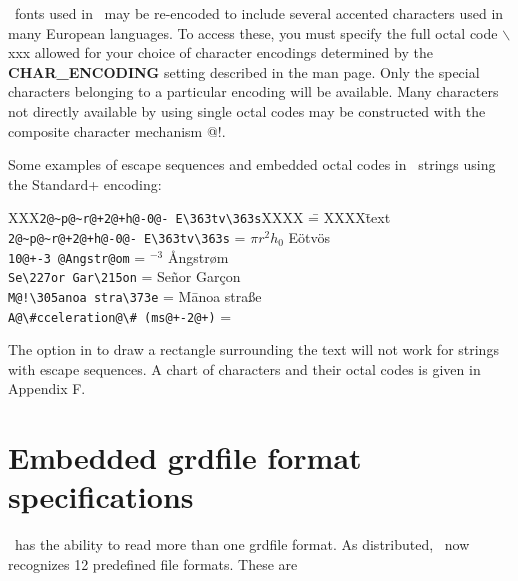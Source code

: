 \PS\ fonts used in \GMT\ may be re-encoded to include
several accented characters used in many European languages.  To
access these, you must specify the full octal code $\backslash$xxx
allowed for your choice of character encodings
determined by the {\bf CHAR\_ENCODING} setting described
in the  man page.  Only the special characters
belonging to a particular encoding will
be available.  Many characters not directly available by
using single octal codes may be constructed with the composite
character mechanism @!.
 
Some examples of escape sequences and embedded octal codes in \GMT\ strings using the
Standard+ encoding: 

\begin{tabbing}
XXX\=\verb|2@~p@~r@+2@+h@-0@- E\363tv\363s|XXXX \== XXXX\=text \kill 
\>\verb|2@~p@~r@+2@+h@-0@- E\363tv\363s| \> = $\pi r^2h_0$ E\"{o}tv\"{o}s \\ 
\>\verb|10@+-3 @Angstr@om|		 \> =	$^{-3}$ \AA ngstr\o m \\ 
\>\verb|Se\227or Gar\215on|	 \> = \> Se\~{n}or Gar\c{c}on \\ 
\>\verb|M@!\305anoa stra\373e|	 \> = \> M\={a}noa stra\ss e \\ 
\>\verb|A@\#cceleration@\# (ms@+-2@+)|	 \> = \> 
\end{tabbing} 

The option in  to draw a rectangle surrounding the text
will not work for strings with escape sequences.  A chart of characters
and their octal codes is given in Appendix F. 

\section{Embedded grdfile format specifications}
\label{sec:grdformats}
\GMT\ has the ability to read more than one grdfile
format.  As distributed, \GMT\ now recognizes 12 predefined file
formats.  These are  

